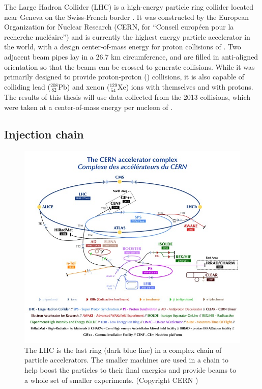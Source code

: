The Large Hadron Collider (LHC) is a high-energy particle ring collider located near Geneva on the Swiss-French border \cite{LHCMachine}.
It was constructed by the European Organization for Nuclear Research (CERN, for ``Conseil européen pour la recherche nucléaire'') and is currently the highest energy particle accelerator in the world, with a design center-of-mass energy for proton collisions of \ppenergy.
Two adjacent beam pipes lay in a 26.7 km circumference, and are filled in anti-aligned orientation so that the beams can be crossed to generate collisions.
While it was primarily designed to provide proton-proton (\pp) collisions, it is also capable of colliding lead (${}^{208}_{\ 82}\textrm{Pb}$) and xenon (${}^{129}_{\ 54}\textrm{Xe}$) ions with themselves and with protons.
The results of this thesis will use data collected from the 2013 \pPb collisions, which were taken at a center-of-mass energy per nucleon of \pPbenergy.

\subsection{Injection chain}

\begin{figure}[t]
\includegraphics{CCC-v2018-print-v2.jpg}
\caption{The LHC is the last ring (dark blue line) in a complex chain of particle accelerators. The smaller machines are used in a chain to help boost the particles to their final energies and provide beams to a whole set of smaller experiments. (Copyright CERN \cite{Mobs:2636343})}
\label{fig:injection_chain}
\end{figure}

